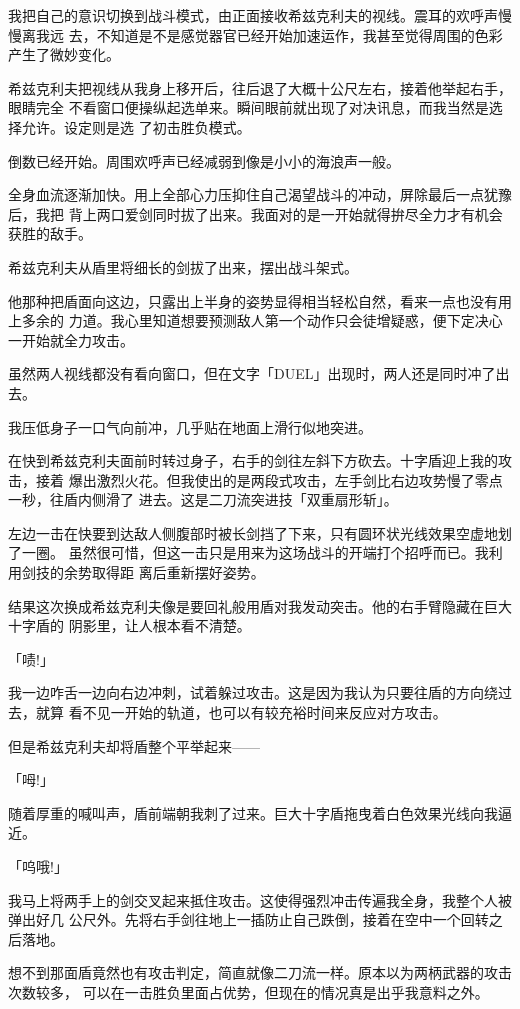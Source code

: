 \documentclass[11pt]{book}
\begin{document}
我把自己的意识切换到战斗模式，由正面接收希兹克利夫的视线。震耳的欢呼声慢慢离我远
去，不知道是不是感觉器官已经开始加速运作，我甚至觉得周围的色彩产生了微妙变化。

希兹克利夫把视线从我身上移开后，往后退了大概十公尺左右，接着他举起右手，眼睛完全
不看窗口便操纵起选单来。瞬间眼前就出现了对决讯息，而我当然是选择允许。设定则是选
了初击胜负模式。

倒数已经开始。周围欢呼声已经减弱到像是小小的海浪声一般。

全身血流逐渐加快。用上全部心力压抑住自己渴望战斗的冲动，屏除最后一点犹豫后，我把
背上两口爱剑同时拔了出来。我面对的是一开始就得拚尽全力才有机会获胜的敌手。

希兹克利夫从盾里将细长的剑拔了出来，摆出战斗架式。

他那种把盾面向这边，只露出上半身的姿势显得相当轻松自然，看来一点也没有用上多余的
力道。我心里知道想要预测敌人第一个动作只会徒增疑惑，便下定决心一开始就全力攻击。

虽然两人视线都没有看向窗口，但在文字「DUEL」出现时，两人还是同时冲了出去。

我压低身子一口气向前冲，几乎贴在地面上滑行似地突进。

在快到希兹克利夫面前时转过身子，右手的剑往左斜下方砍去。十字盾迎上我的攻击，接着
爆出激烈火花。但我使出的是两段式攻击，左手剑比右边攻势慢了零点一秒，往盾内侧滑了
进去。这是二刀流突进技「双重扇形斩」。

左边一击在快要到达敌人侧腹部时被长剑挡了下来，只有圆环状光线效果空虚地划了一圈。
虽然很可惜，但这一击只是用来为这场战斗的开端打个招呼而已。我利用剑技的余势取得距
离后重新摆好姿势。

结果这次换成希兹克利夫像是要回礼般用盾对我发动突击。他的右手臂隐藏在巨大十字盾的
阴影里，让人根本看不清楚。

「啧!」

我一边咋舌一边向右边冲刺，试着躲过攻击。这是因为我认为只要往盾的方向绕过去，就算
看不见一开始的轨道，也可以有较充裕时间来反应对方攻击。

但是希兹克利夫却将盾整个平举起来——

「呣!」

随着厚重的喊叫声，盾前端朝我刺了过来。巨大十字盾拖曳着白色效果光线向我逼近。

「呜哦!」

我马上将两手上的剑交叉起来抵住攻击。这使得强烈冲击传遍我全身，我整个人被弹出好几
公尺外。先将右手剑往地上一插防止自己跌倒，接着在空中一个回转之后落地。

想不到那面盾竟然也有攻击判定，简直就像二刀流一样。原本以为两柄武器的攻击次数较多，
可以在一击胜负里面占优势，但现在的情况真是出乎我意料之外。
\end{document}
